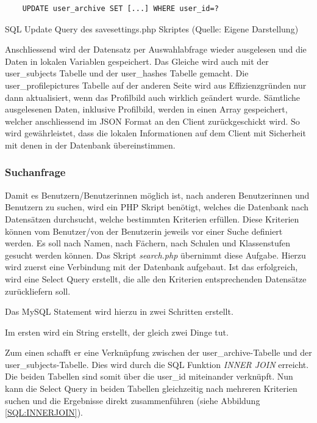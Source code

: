\documentclass[../main.tex]{subfiles}
\begin{document}
	 \begin{code} 
	 	\begin{center}
	 		\begin{verbatim}
	UPDATE user_archive SET [...] WHERE user_id=?
	 		\end{verbatim}
	 		\caption{SQL Update Query des savesettings.php Skriptes (Quelle: Eigene Darstellung)}\label{SQL:UPDATE}
	 	\end{center}
	 \end{code}
	 
	 Anschliessend wird der Datensatz per Auswahlabfrage wieder ausgelesen und die Daten in lokalen Variablen gespeichert. Das Gleiche wird auch mit der user\_subjects Tabelle und der user\_hashes Tabelle gemacht. Die user\_profilepictures Tabelle auf der anderen Seite wird aus Effizienzgründen nur dann aktualisiert, wenn das Profilbild auch wirklich geändert wurde. Sämtliche ausgelesenen Daten, inklusive Profilbild, werden in einen Array gespeichert, welcher anschliessend im JSON Format an den Client zurückgeschickt wird. So wird gewährleistet, dass die lokalen Informationen auf dem Client mit Sicherheit mit denen in der Datenbank übereinstimmen.
	 
	 \subsubsection{Suchanfrage} \label{PHP:Suchanfrage}
	 Damit es Benutzern/Benutzerinnen möglich ist, nach anderen Benutzerinnen und Benutzern zu suchen, wird ein PHP Skript benötigt, welches die Datenbank nach Datensätzen durchsucht, welche bestimmten Kriterien erfüllen. Diese Kriterien können vom Benutzer/von der Benutzerin jeweils vor einer Suche definiert werden. Es soll nach Namen, nach Fächern, nach Schulen und Klassenstufen gesucht werden können. Das Skript \emph{search.php} übernimmt diese Aufgabe. Hierzu wird zuerst eine Verbindung mit der Datenbank aufgebaut. Ist das erfolgreich, wird eine Select Query erstellt, die alle den Kriterien entsprechenden Datensätze zurückliefern soll. 
	 
	 Das MySQL Statement wird hierzu in zwei Schritten erstellt.
	 
	 Im ersten wird ein String erstellt, der gleich zwei Dinge tut. 
	 
	 Zum einen schafft er eine Verknüpfung zwischen der user\_archive-Tabelle und der user\_subjects-Tabelle. Dies wird durch die SQL Funktion \emph{INNER JOIN} erreicht. Die beiden Tabellen sind somit über die user\_id miteinander verknüpft. Nun kann die Select Query in beiden Tabellen gleichzeitig nach mehreren Kriterien suchen und die Ergebnisse direkt zusammenführen (siehe Abbildung \ref{SQL:INNERJOIN}).
	 
\end{document}
